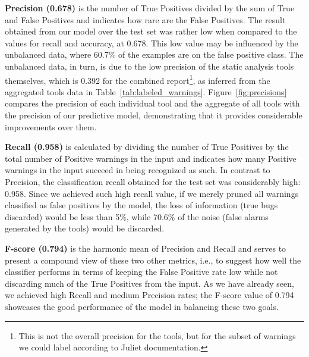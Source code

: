 \textbf{Precision (0.678)} is the number of True Positives divided
    by the sum of True and False Positives and indicates how rare are the
    False Positives. The result obtained from our model over the test set
    was rather low when compared to the values for recall and accuracy, at
    0.678. This low value may be influenced by the unbalanced data, where
    60.7\% of the examples are on the false positive class. The unbalanced
    data, in turn, is due to the low precision of the static analysis tools
    themselves, which is 0.392 for the combined report\footnote{This is not the
    overall precision for the tools, but for the subset of warnings we could
    label according to Juliet documentation.}, as inferred from the aggregated
    tools data in Table~\ref{tab:labeled_warnings}. Figure~\ref{fig:precisions}
    compares the precision of each individual tool and the aggregate of all tools with the precision
    of our predictive model, demonstrating that it provides considerable
    improvements over them.

\textbf{Recall (0.958)} is calculated by dividing the
    number of True Positives by the total number of Positive warnings
    in the input and indicates how many Positive
    warnings in the input succeed in being recognized as such. In contrast
    to Precision, the classification recall obtained
    for the test set was considerably high: 0.958. Since we achieved such
    high recall value, if we merely pruned all warnings classified as false positives by the model,
    the loss of information (true bugs discarded) would be less than 5\%, while
    70.6\% of the noise (false alarms generated by the tools) would be discarded.

\textbf{F-score (0.794)} is the harmonic mean of Precision and Recall and
serves to present a compound view of these two other metrics, i.e., to
suggest how well the classifier performs in terms of keeping the
False Positive rate low while not discarding much of the True Positives from
the input. As we have already seen, we achieved high Recall and medium
Precision rates; the F-score value of 0.794 showcases the good performance
of the model in balancing these two goals.


